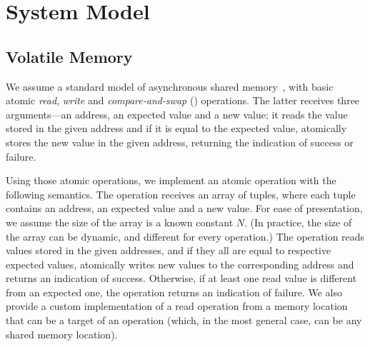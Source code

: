 
\section{System Model}
\label{sec:model}
\subsection{Volatile Memory}
\label{sec:volatile-model}
We assume a standard model of asynchronous shared memory~\cite{HW+91}, with basic atomic \emph{read}, \emph{write} and \emph{compare-and-swap} (\cas{}) operations.
The latter receives three arguments---an address, an expected value and a new value; it reads the value stored in
the given address and if it is equal to the expected value, atomically stores the new value in the given address, returning the indication of success or failure.


Using those atomic operations, we implement an atomic \mcas{} operation with the following semantics.
The \mcas{} operation receives an array of tuples, where each tuple contains an address, an expected value and a new value.
For ease of presentation, we assume the size of the array is a known constant $N$.
(In practice, the size of the array can be dynamic, and different for every \mcas{} operation.)
The \mcas{} operation reads values stored in the given addresses, and if they all are equal to respective expected values, atomically
writes new values to the corresponding address and returns an indication of success.
Otherwise, if at least one read value is different from an expected one, the \mcas{} operation returns an indication of failure.
We also provide a custom implementation of a read operation from a memory location that can be a 
target of an \mcas{} operation (which, in the most general case, can be any shared memory location).

